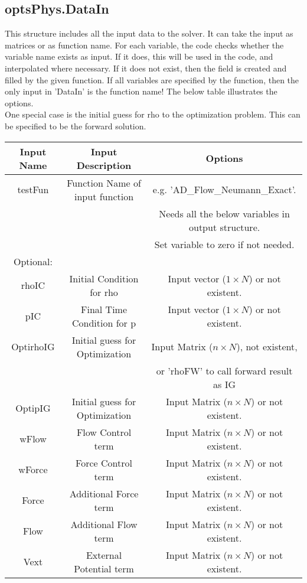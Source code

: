 \documentclass[11pt, a4paper]{article}
\theoremstyle{definition}
\begin{document}
\subsection{optsPhys.DataIn}	
This structure includes all the input data to the solver. It can take the input as matrices or as function name. For each variable, the code checks whether the variable name exists as input. If it does, this will be used in the code, and interpolated where necessary. If it does not exist, then the field is created and filled by the given function. If all variables are specified by the function, then the only input in 'DataIn' is the function name! The below table illustrates the options. \\
One special case is the initial guess for rho to the optimization problem. This can be specified to be the forward solution.
	
 \begin{center}
	\begin{tabular}{ |c| c | c|}
		\hline
		Input Name & Input Description & Options \\ 
		\hline
		testFun & Function Name of input function & e.g. 'AD\_Flow\_Neumann\_Exact'. \\
		& & Needs all the below variables in output structure. \\
	 	& & Set variable to zero if not needed. \\ 
		\hline
		Optional: & & \\
		\hline
		rhoIC & Initial Condition for rho & Input vector ($1 \times N$) or not existent.\\
		pIC & Final Time Condition for p & Input vector ($1 \times N$) or not existent.\\ 
		OptirhoIG & Initial guess for Optimization & Input Matrix ($n \times N$), not existent, \\
		& & or 'rhoFW' to call forward result as IG\\
		OptipIG &  Initial guess for Optimization & Input Matrix ($n \times N$) or not existent. \\
		wFlow & Flow Control term & Input Matrix ($n \times N$) or not existent. \\
		wForce & Force Control term & Input Matrix ($n \times N$) or not existent. \\
		Force & Additional Force term  & Input Matrix ($n \times N$) or not existent. \\
		Flow & Additional Flow  term & Input Matrix ($n \times N$) or not existent. \\
		Vext & External Potential term & Input Matrix ($n \times N$) or not existent. \\
		\hline
	\end{tabular}
 \end{center}		
	
\end{document}
